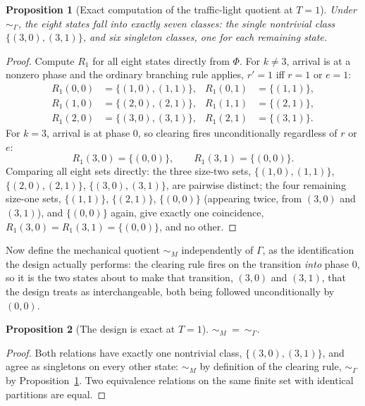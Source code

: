 \documentclass[11pt]{report}
\newtheorem{proposition}{Proposition}[chapter]
\begin{document}
\begin{proposition}[Exact computation of the traffic-light quotient at $T=1$]
\label{prop:tlquotient}
Under $\sim_\Gamma$, the eight states fall into exactly seven classes:
the single nontrivial class $\{(3,0),(3,1)\}$, and six singleton
classes, one for each remaining state.
\end{proposition}
\begin{proof}
Compute $R_1$ for all eight states directly from $\Phi$. For
$k \neq 3$, arrival is at a nonzero phase and the ordinary branching
rule applies, $r' = 1$ iff $r=1$ or $e=1$:
\begin{align*}
R_1(0,0) &= \{(1,0),(1,1)\}, & R_1(0,1) &= \{(1,1)\}, \\
R_1(1,0) &= \{(2,0),(2,1)\}, & R_1(1,1) &= \{(2,1)\}, \\
R_1(2,0) &= \{(3,0),(3,1)\}, & R_1(2,1) &= \{(3,1)\}.
\end{align*}
For $k=3$, arrival is at phase $0$, so clearing fires unconditionally
regardless of $r$ or $e$:
\[
R_1(3,0) = \{(0,0)\}, \qquad R_1(3,1) = \{(0,0)\}.
\]
Comparing all eight sets directly: the three size-two sets,
$\{(1,0),(1,1)\}$, $\{(2,0),(2,1)\}$, $\{(3,0),(3,1)\}$, are pairwise
distinct; the four remaining size-one sets, $\{(1,1)\}$, $\{(2,1)\}$,
$\{(0,0)\}$ (appearing twice, from $(3,0)$ and $(3,1)$), and
$\{(0,0)\}$ again, give exactly one coincidence, $R_1(3,0) = R_1(3,1)
= \{(0,0)\}$, and no other.
\end{proof}

Now define the mechanical quotient $\sim_M$ independently of
$\Gamma$, as the identification the design actually performs: the
clearing rule fires on the transition \emph{into} phase $0$, so it is
the two states about to make that transition, $(3,0)$ and $(3,1)$,
that the design treats as interchangeable, both being followed
unconditionally by $(0,0)$.

\begin{proposition}[The design is exact at $T=1$]
$\sim_M\ =\ \sim_\Gamma$.
\end{proposition}
\begin{proof}
Both relations have exactly one nontrivial class, $\{(3,0),(3,1)\}$,
and agree as singletons on every other state: $\sim_M$ by definition
of the clearing rule, $\sim_\Gamma$ by Proposition~\ref{prop:tlquotient}.
Two equivalence relations on the same finite set with identical
partitions are equal.
\end{proof}
\end{document}
